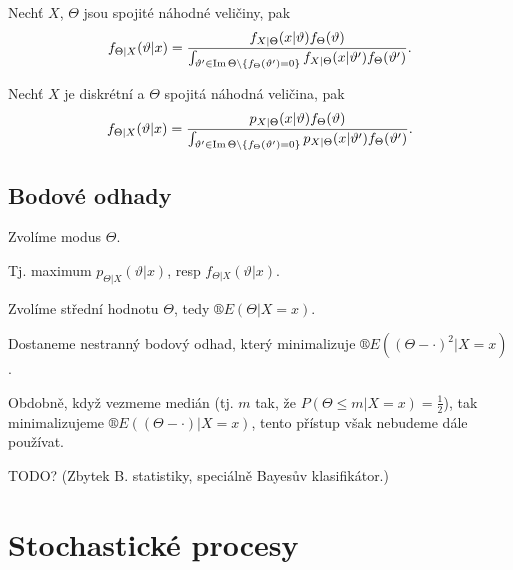 \documentclass[12pt]{article}					%
\begin{document}
\begin{veta}
	Nechť $X$, $\Theta$ jsou spojité náhodné veličiny, pak
	$$ f_{\Theta | X}(\vartheta | x) = \frac{f_{X|\Theta}(x|\vartheta) f_\Theta(\vartheta)}{\int_{\vartheta' \in \operatorname{Im} \Theta \setminus \{f_\Theta(\vartheta') = 0\}} f_{X|\Theta}(x|\vartheta')f_\Theta(\vartheta')}. $$
\end{veta}

\begin{veta}
	Nechť $X$ je diskrétní a $\Theta$ spojitá náhodná veličina, pak
	$$ f_{\Theta | X}(\vartheta | x) = \frac{p_{X|\Theta}(x|\vartheta) f_\Theta(\vartheta)}{\int_{\vartheta' \in \operatorname{Im} \Theta \setminus \{f_\Theta(\vartheta') = 0\}} p_{X|\Theta}(x|\vartheta')f_\Theta(\vartheta')}. $$
\end{veta}

\subsection{Bodové odhady}

\begin{definice}
	Zvolíme modus $\Theta$.

	\begin{poznamkain}
		Tj. maximum $p_{\Theta|X}(\vartheta|x)$, resp $f_{\Theta|X}(\vartheta|x)$.
	\end{poznamkain}
\end{definice}

\begin{definice}
	Zvolíme střední hodnotu $\Theta$, tedy $®E(\Theta | X = x)$.

	\begin{poznamka}
		Dostaneme nestranný bodový odhad, který minimalizuje $®E((\Theta - ·)^2 | X = x)$.
	\end{poznamka}
\end{definice}

\begin{poznamka}[Medián]
	Obdobně, když vezmeme medián (tj. $m$ tak, že $P(\Theta ≤ m | X = x) = \frac{1}{2}$), tak minimalizujeme $®E((\Theta - ·) | X = x)$, tento přístup však nebudeme dále používat.
\end{poznamka}

TODO? (Zbytek B. statistiky, speciálně Bayesův klasifikátor.) %

\section{Stochastické procesy}
\end{document}
